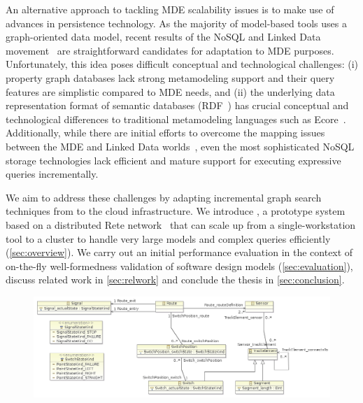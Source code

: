 An alternative approach to tackling MDE scalability issues is to make use of advances in persistence technology. As the majority of model-based tools uses a graph-oriented data model, recent results of the NoSQL and Linked Data movement~\cite{neo4j,openvirtuoso,sesame} are straightforward candidates for adaptation to MDE purposes. Unfortunately, this idea poses difficult conceptual and technological challenges: (i) property graph databases lack strong metamodeling support and their query features are simplistic compared to MDE needs, and (ii) the underlying data representation format of semantic databases (RDF~\cite{website:rdf_standard}) has crucial conceptual and technological differences to traditional metamodeling languages such as Ecore~\cite{EMF}. Additionally, while there are initial efforts to overcome the mapping issues between the MDE and Linked Data worlds~\cite{hillairet2008bridging}, even the most sophisticated NoSQL storage technologies lack efficient and mature support for executing expressive queries incrementally.


We aim to address these challenges by adapting incremental graph search techniques from \eiq{} to the cloud infrastructure. We introduce \iqd, a prototype system based on a distributed Rete network~\cite{Forgy} that can scale up from a single-workstation tool to a cluster to handle very large models and complex queries efficiently (\autoref{sec:overview}). We carry out an initial performance evaluation in the context of on-the-fly well-formedness validation of software design models (\autoref{sec:evaluation}), discuss related work in \autoref{sec:relwork} and conclude the thesis in \autoref{sec:conclusion}.

\begin{figure}
\begin{center}
\includegraphics[]{figures/TrainMetamodel}
\caption{}
\label{fig:}
\end{center}
\end{figure}

